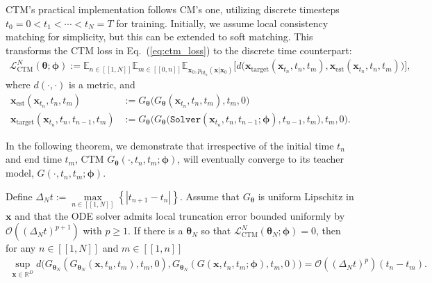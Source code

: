\documentclass{article} \usepackage{iclr2024_coNFErence,times}
\def\eqref#1{equation~\ref{#1}}
\newcommand{\abs}[1]{\left|#1\right|}
\def\eqref#1{(\ref{#1})}
\def\eqref#1{(\ref{#1})}
\theoremstyle{definition}
\theoremstyle{remark}
\begin{document}
CTM's practical implementation follows CM's one, utilizing discrete timesteps $t_0=0<t_1<\cdots<t_N=T$ for training. Initially, we assume local consistency matching for simplicity, but this can be extended to soft matching. This transforms the CTM loss in Eq.~\eqref{eq:ctm_loss} to the discrete time counterpart:
\begin{align*}
    \mathcal{L}^{N}_{\text{CTM}}(\bm{\theta};\bm{\phi}):=\mathbb{E}_{n\in[\![ 1,N ]\!]}\mathbb{E}_{m\in[\![ 0,n ]\!]}\mathbb{E}_{\mathbf{x}_{0}, p_{0t_{n}}(\mathbf{x}\vert\mathbf{x}_{0})}\Big[d\big(\mathbf{x}_{\text{target}}(\mathbf{x}_{t_n},t_n,t_m),\mathbf{x}_{\text{est}}(\mathbf{x}_{t_n},t_n,t_m)\big)\Big],
\end{align*}
where $d(\cdot, \cdot)$ is a metric, and
\begin{align*}
    \mathbf{x}_{\text{est}}(\mathbf{x}_{t_n},t_n,t_m)&:=G_{\bm{\theta}}\Big(G_{\bm{\theta}}(\mathbf{x}_{t_n},t_n,t_m),t_m,0\Big)\nonumber
    \\ \mathbf{x}_{\text{target}}(\mathbf{x}_{t_n},t_n,t_{n-1},t_m)&:=G_{\bm{\theta}}\Big(G_{\bm{\theta}}\big(\texttt{Solver}(\mathbf{x}_{t_n}, t_n,t_{n-1};\bm{\phi}),t_{n-1},t_m\big),t_m,0\Big).
\end{align*}



In the following theorem, we demonstrate that irrespective of the initial time $t_n$ and end time $t_m$, CTM $G_{\bm{\theta}}(\cdot, t_n, t_m; \bm{\phi})$, will eventually converge to its teacher model, $G(\cdot, t_n, t_m; \bm{\phi})$.



\begin{proposition}\label{th:ptw_distill} Define $\Delta_N t:=\underset{n\in[\![ 1,N ]\!]}{\max}\left\{\abs{t_{n+1}-t_n}\right\}$.  Assume
that $G_{\bm{\theta}}$ is uniform Lipschitz in $\bm{x}$ and that the ODE solver admits local truncation error bounded uniformly by $\mathcal{O}((\Delta_N t)^{p+1})$ with $p\geq 1$. If there is a $\bm{\theta}_N$ so that $\mathcal{L}_{\text{CTM}}^{N}(\bm{\theta}_N;\bm{\phi})=0$, then for any $n\in[\![ 1,N ]\!]$ and $m\in[\![ 1,n ]\!]$  
\begin{align*}
    \sup_{\mathbf{x}\in\mathbb{R}^D} d\big(G_{\bm{\theta}_N}(G_{\bm{\theta}_N}(\mathbf{x}, t_n, t_m), t_m, 0) ,G_{\bm{\theta}_N}(G(\mathbf{x}, t_n, t_m; \bm{\phi}), t_m, 0)\big) = \mathcal{O}((\Delta_N t)^{p})(t_n - t_m).
\end{align*}

\end{proposition}
\end{document}
